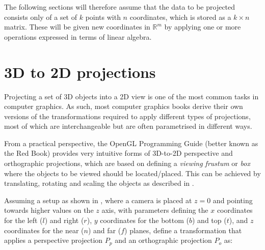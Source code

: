 The following sections will therefore assume that the data to be projected consists only of a set of $k$ points with $n$ coordinates, which is stored as a $k \times n$ matrix.
These will be given new coordinates in $\mathbb{R}^m$ by applying one or more operations expressed in terms of linear algebra.

\section{3D to 2D projections}
\label{se:3dto2d}

Projecting a set of 3D objects into a 2D view is one of the most common tasks in computer graphics.
As such, most computer graphics books derive their own versions of the transformations required to apply different types of projections, most of which are interchangeable but are often parametrised in different ways.

From a practical perspective, the OpenGL Programming Guide (better known as the Red Book) \citep{Shreiner13} provides very intuitive forms of 3D-to-2D perspective and orthographic projections, which are based on defining a \emph{viewing frustum} or \emph{box} where the objects to be viewed should be located/placed.
This can be achieved by translating, rotating and scaling the objects as described in .

Assuming a setup as shown in , where a camera is placed at $z = 0$ and pointing towards higher values on the $z$ axis, with parameters defining the $x$ coordinates for the left ($l$) and right ($r$), $y$ coordinates for the bottom ($b$) and top ($t$), and $z$ coordinates for the near ($n$) and far ($f$) planes, \citet[Ch.~5]{Shreiner13} define a transformation that applies a perspective projection $P_p$ and an orthographic projection $P_o$ as:

